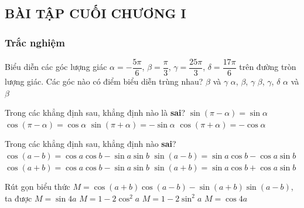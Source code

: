 \begin{bt}
\subsection{BÀI TẬP CUỐI CHƯƠNG I}
\subsubsection{Trắc nghiệm}
\begin{bt}%
	Biểu diễn các góc lượng giác $\alpha=-\dfrac{5\pi}{6}$, $\beta=\dfrac{\pi}{3}$, $\gamma=\dfrac{25\pi}{3}$, $\delta=\dfrac{17\pi}{6}$ trên đường tròn lượng giác. Các góc nào có điểm biểu diễn trùng nhau?
	\choice
	{\True $\beta$ và $\gamma$}
	{$\alpha$, $\beta$, $\gamma$}
	{$\beta$, $\gamma$, $\delta$}
	{$\alpha$ và $\beta$}
\end{bt}

\begin{bt}%
	Trong các khẳng định sau, khẳng định  nào là \textbf{sai}?
	\choice
	{$\sin(\pi-\alpha)=\sin\alpha$}
	{\True $\cos(\pi-\alpha)=\cos \alpha$}
	{$\sin(\pi+\alpha)=-\sin\alpha$}
	{$\cos(\pi+\alpha)=-\cos \alpha$}
\end{bt}

\begin{bt}%
	Trong các khẳng định sau, khẳng định nào \textbf{sai}?
	\choice
	{\True $\cos (a-b)=\cos a\cos b-\sin a\sin b$}
	{$\sin (a-b)=\sin a\cos b-\cos a\sin b$}
	{$\cos (a+b)=\cos a\cos b-\sin a\sin b$}
	{$\sin (a+b)=\sin a\cos b+\cos a\sin b$}
\end{bt}

\begin{bt}%
	Rút gọn biểu thức $M=\cos(a+b)\cos(a-b)-\sin (a+b)\sin(a-b)$, ta được
	\choice
	{$M=\sin 4a$}
	{$M=1-2\cos^2a$}
	{\True $M=1-2\sin^2a$}
	{$M=\cos 4a$}
\end{bt}


\end{bt}
